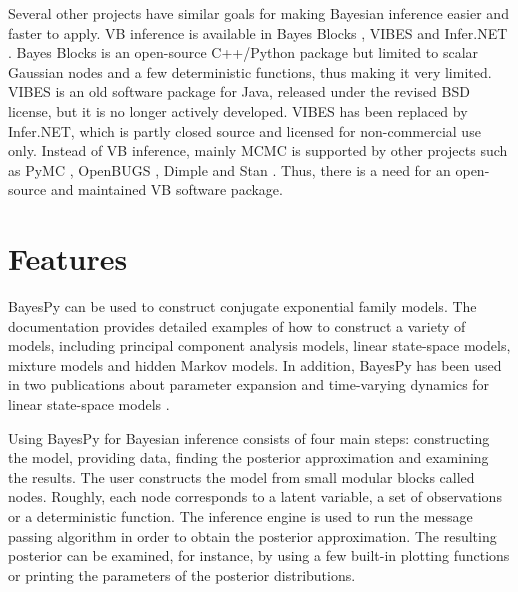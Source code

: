 \documentclass[twoside,11pt]{article}
\begin{document}
Several other projects have similar goals for making Bayesian inference easier
and faster to apply.  VB inference is available in Bayes Blocks
\citep{Raiko:2007}, VIBES \citep{Bishop:2002} and Infer.NET \citep{Infer.NET}.
Bayes Blocks is an open-source C++/Python package but limited to scalar Gaussian
nodes and a few deterministic functions, thus making it very limited.  VIBES is
an old software package for Java, released under the revised BSD license, but it
is no longer actively developed.  VIBES has been replaced by Infer.NET, which
is partly closed source and licensed for non-commercial use only.  Instead of VB
inference, mainly MCMC is supported by other projects such as PyMC \citep{PyMC},
OpenBUGS \citep{OpenBUGS}, Dimple \citep{Dimple} and Stan \citep{Stan}.  Thus,
there is a need for an open-source and maintained VB software package.



\section{Features}


BayesPy can be used to construct conjugate exponential family models.  The
documentation provides detailed examples of how to construct a variety of
models, including principal component analysis models, linear state-space
models, mixture models and hidden Markov models.  In addition, BayesPy has been
used in two publications about parameter expansion and time-varying dynamics for
linear state-space models \citep{Luttinen:2013,Luttinen:2014}.



Using BayesPy for Bayesian inference consists of four main steps: constructing
the model, providing data, finding the posterior approximation and examining the
results.  The user constructs the model from small modular blocks called nodes.
Roughly, each node corresponds to a latent variable, a set of observations or a
deterministic function.
The inference engine is used to run the message passing algorithm in order to
obtain the posterior approximation.  The resulting posterior can be examined,
for instance, by using a few built-in plotting functions or printing the
parameters of the posterior distributions.
\end{document}
